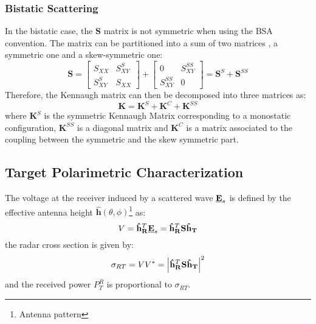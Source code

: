 \documentclass[11pt]{article}
\begin{document}
\subsubsection{Bistatic Scattering}
In the bistatic case, the $\mathbf{S}$ matrix is not symmetric when using the BSA convention. The matrix can be partitioned into a sum of two matrices , a symmetric one and a skew-symmetric one:
\begin{equation}
	\mathbf{S} = 
	\begin{bmatrix}
		S_{XX} & S_{XY}^{S} \\
		S_{XY}^{S} & S_{XX}
	\end{bmatrix} 
	+	
	\begin{bmatrix}
		0 & S_{XY}^{SS} \\
		S_{XY}^{SS} & 0
	\end{bmatrix} 
	=
	\mathbf{S}^{S} + \mathbf{S}^{SS}
\end{equation} 
Therefore, the Kennaugh matrix can then be decomposed into three matrices as:
\begin{equation}
	\mathbf{K} = \mathbf{K}^{S} + \mathbf{K}^{C} + \mathbf{K}^{SS}
\end{equation}
where $\mathbf{K}^{S}$ is the symmetric Kennaugh Matrix corresponding to a monostatic configuration, $\mathbf{K}^{SS}$ is a diagonal matrix and $\mathbf{K}^{C}$ is a matrix associated to the coupling between the symmetric and the skew symmetric part.
\subsection{Target Polarimetric Characterization}
The voltage at the receiver induced by a scattered wave $\mathbf{\underline{E}}_{s}$ is defined by the effective antenna height $\hat{\mathbf{h}}\left(\theta,\phi\right)$\footnote{Antenna pattern} as:
\begin{equation}
	V = \mathbf{\hat{h}_{R}}^{T}\mathbf{\underline{E}}_{s} = \mathbf{\hat{h}_{R}}^{T}\mathbf{S}\mathbf{\hat{h}_{T}}
\end{equation}
the radar cross section is given by:
\begin{equation}
	\sigma_{RT} = VV^{*} = \left|\mathbf{\hat{h}_{R}}^{T}\mathbf{S}\mathbf{\hat{h}_{T}}\right|^{2}
\end{equation}
and the received power $P_{T}^{R}$ is proportional to $\sigma_{RT}$. 
\end{document}
